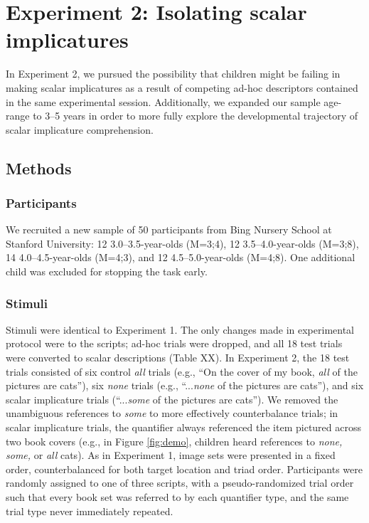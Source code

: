 \documentclass[man]{apa2}
\begin{document}
\section{Experiment 2: Isolating scalar implicatures}
In Experiment 2, we pursued the possibility that children might be failing in making scalar implicatures as a result of competing ad-hoc descriptors contained in the same experimental session. Additionally, we expanded our sample age-range to 3--5 years in order to more fully explore the developmental trajectory of scalar implicature comprehension. 

\subsection{Methods}
\subsubsection{Participants} 

We recruited a new sample of 50 participants from Bing Nursery School at Stanford University: 12 3.0--3.5-year-olds (M=3;4), 12 3.5--4.0-year-olds (M=3;8), 14 4.0--4.5-year-olds (M=4;3), and 12 4.5--5.0-year-olds (M=4;8). One additional child was excluded for stopping the task early.

\subsubsection{Stimuli}
Stimuli were identical to Experiment 1. The only changes made in experimental protocol were to the scripts; ad-hoc trials were dropped, and all 18 test trials were converted to scalar descriptions (Table XX). In Experiment 2, the 18 test trials consisted of six control \textit{all} trials (e.g., ``On the cover of my book, \textit{all} of the pictures are cats''), six \textit{none} trials (e.g., ``...\textit{none} of the pictures are cats''), and six scalar implicature trials (``...\textit{some} of the pictures are cats''). We removed the unambiguous references to \textit{some} to more effectively counterbalance trials; in scalar implicature trials, the quantifier always referenced the item pictured across two book covers (e.g., in Figure \ref{fig:demo}, children heard references to \textit{none, some,} or \textit{all} cats). As in Experiment 1, image sets were presented in a fixed order, counterbalanced for both target location and triad order. Participants were randomly assigned to one of three scripts, with a pseudo-randomized trial order such that every book set was referred to by each quantifier type, and the same trial type never immediately repeated.
\end{document}
